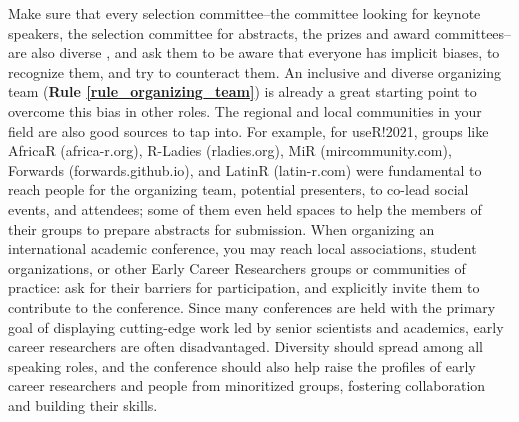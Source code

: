 \documentclass[10pt,letterpaper]{article}
\begin{document}
Make sure that every selection committee--the committee looking for keynote speakers, the selection committee for abstracts, the prizes and award committees--are also diverse \cite{swartzScienceValueDiversity2019, wongBuildDiversityScience2020}, and ask them to be aware that everyone has implicit biases, to recognize them, and try to counteract them. 
An inclusive and diverse organizing team (\textbf{Rule \ref{rule_organizing_team}}) is already a great starting point to overcome this bias in other roles. The regional and local communities in your field are also good sources to tap into. 
For example, for useR!2021, groups like AfricaR (africa-r.org), R-Ladies (rladies.org), MiR (mircommunity.com), Forwards (forwards.github.io), and LatinR (latin-r.com) were fundamental to reach people for the organizing team, potential presenters, to co-lead social events, and attendees; some of them even held spaces to help the members of their groups to prepare abstracts for submission.
When organizing an international academic conference, you may reach local associations, student organizations, or other Early Career Researchers groups or communities of practice: ask for their barriers for participation, and explicitly invite them to contribute to the conference. %
Since many conferences are held with the primary goal of displaying cutting-edge work led by senior scientists and academics, early career researchers are often disadvantaged. Diversity should spread among all speaking roles, and the conference should also help raise the profiles of early career researchers and people from minoritized groups, fostering collaboration and building their skills.
\end{document}
